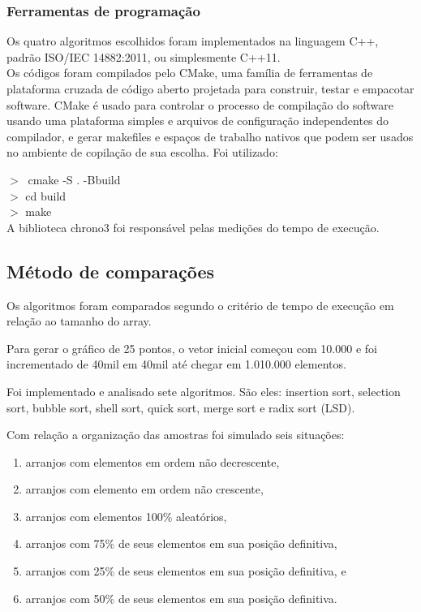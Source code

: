 \documentclass[a4paper, 12pt]{article}
\begin{document}
		\subsubsection{Ferramentas de programação}
	Os quatro algoritmos escolhidos foram implementados na linguagem C++, padrão ISO/IEC 14882:2011, ou simplesmente C++11.\\
	\indent Os códigos foram compilados pelo CMake, uma família de ferramentas de plataforma cruzada de código aberto projetada para construir, testar e empacotar software. CMake é usado para controlar o processo de compilação do software usando uma plataforma simples e arquivos de configuração independentes do compilador, e gerar makefiles e espaços de trabalho nativos que podem ser usados no ambiente de copilação de sua escolha. Foi utilizado:
	
	\indent 	$>~$  cmake -S . -Bbuild  \\
		\indent $>$ cd build  \\
		\indent $>$ make\\
	
	\indent A biblioteca chrono3 foi responsável pelas medições do tempo de execução.
	
	\subsection{Método de comparações }
	Os algoritmos foram comparados segundo o critério de tempo de execução em relação ao tamanho do array.
	
\indent Para gerar o gráfico de 25 pontos, o vetor inicial começou com 10.000 e foi incrementado de 40mil em 40mil até chegar em 1.010.000 elementos.

\indent Foi implementado e analisado sete algoritmos. São eles: insertion
sort, selection sort, bubble sort, shell sort, quick sort, merge sort e radix sort (LSD).



\indent Com relação a organização das amostras foi simulado seis situações:



\begin{enumerate}

\item  arranjos com elementos em ordem não decrescente,
\item  arranjos com elemento em ordem não crescente,
\item  arranjos com elementos 100\% aleatórios,
\item  arranjos com 75\% de seus elementos em sua posição definitiva,
\item  arranjos com 25\% de seus elementos em sua posição definitiva, e
\item  arranjos com 50\% de seus elementos em sua posição definitiva.
\end{enumerate}
\end{document}
